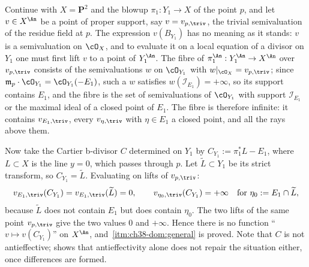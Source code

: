\begin{example}
\label{ex:ch38-evaluation-no-lift}
Continue with $X=\mathbf P^2$ and the blowup $\pi_1:Y_1\to X$ of the
point $p$, and let $v\in X^{\An}$ be a point of proper support, say
$v=v_{p,\triv}$, the trivial semivaluation of the residue field at
$p$.  The expression $v(B_{Y_1})$ has no meaning as it stands: $v$
is a semivaluation on $\cO_X$, and to evaluate it on a local equation of
a divisor on $Y_1$ one must first lift $v$ to a point of
$Y_1^{\An}$.  The fibre of $\pi_1^{\An}:Y_1^{\An}\to X^{\An}$ over
$v_{p,\triv}$ consists of the semivaluations $w$ on $\cO_{Y_1}$ with
$w|_{\cO_X}=v_{p,\triv}$; since
$\mathfrak m_p\cdot\cO_{Y_1}=\cO_{Y_1}(-E_1)$, such a $w$ satisfies
$w(\mathcal I_{E_1})=+\infty$, so its support contains $E_1$, and the
fibre is the set of semivaluations of $\cO_{Y_1}$ with support
$\mathcal I_{E_1}$ or the maximal ideal of a closed point of $E_1$.
The fibre is therefore infinite: it contains
$v_{E_1,\triv}$, every $v_{\eta,\triv}$ with $\eta\in E_1$ a closed
point, and all the rays above them.

Now take the Cartier b-divisor $C$ determined on $Y_1$ by
$C_{Y_1}:=\pi_1^*L-E_1$, where $L\subset X$ is the line $y=0$, which
passes through $p$.  Let $\widetilde L\subset Y_1$ be its strict
transform, so $C_{Y_1}=\widetilde L$.  Evaluating on lifts of
$v_{p,\triv}$:
\[
 v_{E_1,\triv}(C_{Y_1})=v_{E_1,\triv}(\widetilde L)=0,
 \qquad
 v_{\eta_0,\triv}(C_{Y_1})=+\infty
 \quad\text{for }\eta_0:=E_1\cap\widetilde L,
\]
because $\widetilde L$ does not contain $E_1$ but does contain
$\eta_0$.  The two lifts of the same point $v_{p,\triv}$ give the two
values $0$ and $+\infty$.  Hence there is no function
``$v\mapsto v(C_{Y_1})$'' on $X^{\An}$, and
\,\cref{itm:ch38-dom:general} is proved.
Note that $C$ is not antieffective; 
shows that antieffectivity alone does not repair the situation either,
once differences are formed.
\end{example}

